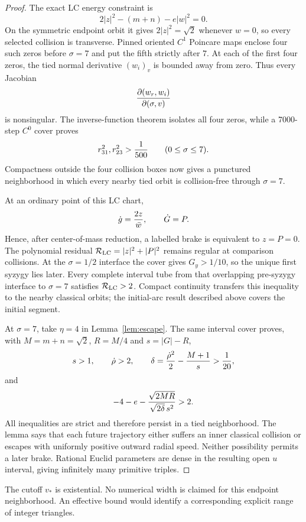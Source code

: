 \begin{proof}
The exact LC energy constraint is
\[
 2|z|^2-(m+n)-e|w|^2=0.
\]
On the symmetric endpoint orbit it gives $2|z|^2=\sqrt2$ whenever $w=0$,
so every selected collision is transverse.  Pinned oriented $C^1$ Poincare
maps enclose four such zeros before $\sigma=7$ and put the fifth strictly
after $7$.  At each of the first four zeros, the tied normal derivative
$(w_i)_v$ is bounded away from zero.  Thus every Jacobian
\[
 {\partial(w_r,w_i)\over\partial(\sigma,v)}
\]
is nonsingular.  The inverse-function theorem isolates all four zeros, while
a 7000-step $C^0$ cover proves
\[
 r_{31}^2,r_{23}^2>{1\over500}
 \qquad(0\leq\sigma\leq7).
\]
Compactness outside the four collision boxes now gives a punctured
neighborhood in which every nearby tied orbit is collision-free through
$\sigma=7$.

At an ordinary point of this LC chart,
\[
 \dot g={2z\over\bar w},\qquad \dot G=P.
\]
Hence, after center-of-mass reduction, a labelled brake is equivalent to
$z=P=0$.  The polynomial residual
$\mathcal R_{\rm LC}=|z|^2+|P|^2$ remains regular at comparison collisions.
At the $\sigma=1/2$ interface the cover gives $G_y>1/10$, so the unique first
syzygy lies later.  Every complete interval tube from that overlapping
pre-syzygy interface to
$\sigma=7$ satisfies $\mathcal R_{\rm LC}>2$.  Compact continuity transfers
this inequality to the nearby classical orbits; the initial-arc result described above covers the initial segment.

At $\sigma=7$, take $\eta=4$ in Lemma~\ref{lem:escape}. The
same interval cover proves, with $M=m+n=\sqrt2$, $R=M/4$ and
$s=|G|-R$,
\[
 s>1,\qquad \dot\rho>2,\qquad
 \delta={\dot\rho^2\over2}-{M+1\over s}>{1\over20},
\]
and
\[
 -4-e-{\sqrt{2MR}\over\sqrt{2\delta}\,s^2}>2.
\]
All inequalities are strict and therefore persist in a tied neighborhood.
The lemma says that each future trajectory either suffers an
inner classical collision or escapes with uniformly positive outward radial
speed.  Neither possibility permits a later brake.  Rational Euclid
parameters are dense in the resulting open $u$ interval, giving infinitely
many primitive triples.
\end{proof}

The cutoff $v_*$ is existential. No numerical width is claimed for this
endpoint neighborhood. An effective bound would identify a corresponding
explicit range of integer triangles.
